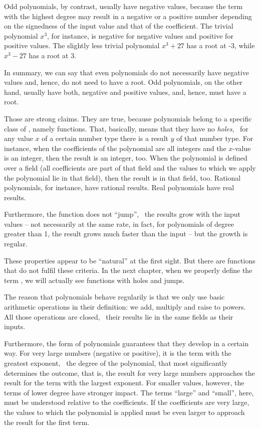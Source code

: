 \documentclass[tikz]{scrreprt}
\begin{document}
Odd polynomials, by contrast, usually have negative values, because
the term with the highest degree may result in a negative or a
positive number depending on the signedness of the input value
and that of the coefficient.
The trivial polynomial $x^3$, for instance, is negative for
negative values and positive for positive values. The slightly
less trivial polynomial $x^3 + 27$ has a root at -3, while
$x^3 - 27$ has a root at 3.

In summary, we can say that even polynomials do not necessarily
have negative values and, hence, do not need to have a root.
Odd polynomials, on the other hand, usually have both, negative
and positive values, and, hence, must have a root.

Those are strong claims. They are true, because polynomials
belong to a specific class of , 
namely  functions.
That, basically, means that they have no \emph{holes}, \ie\
for any value $x$ of a certain number type there is a result $y$
of that number type. For instance, when the coefficients of the
polynomial are all integers and the $x$-value is an integer,
then the result is an integer, too. When the polynomial is defined
over a field (all coefficients are part of that field and
the values to which we apply the polynomial lie in that field),
then the result is in that field, too. Rational polynomials,
for instance, have rational results. 
Real polynomials have real results.

Furthermore, the function does not ``jump'', \ie\ the results
grow with the input values -- not necessarily
at the same rate, in fact, for polynomials of degree greater than 1,
the result grows much faster than the input -- but the growth
is regular.

These properties appear to be ``natural'' at the first sight.
But there are functions that do not fulfil these criteria.
In the next chapter, when we properly define the term ,
we will actually see functions with holes and jumps.

The reason that polynomials behave regularily is that we only
use basic arithmetic operations in their definition: we add, multiply
and raise to powers. 
All those operations are closed, \ie\ their results lie
in the same fields as their inputs. 

Furthermore, the form of polynomials guarantees that they develop
in a certain way. For very large numbers (negative or positive), 
it is the term with the greatest exponent, \ie\ the degree 
of the polynomial, that most significantly determines the
outcome, that is, the result for very large numbers
approaches the result for the term with the largest exponent. 
For smaller values, however, the terms of lower degree have
stronger impact. The terms ``large'' and ``small'', here, 
must be understood relative to the coefficients. If the coefficients
are very large, the values to which the polynomial is applied
must be even larger to approach the result for the first term.
\end{document}
